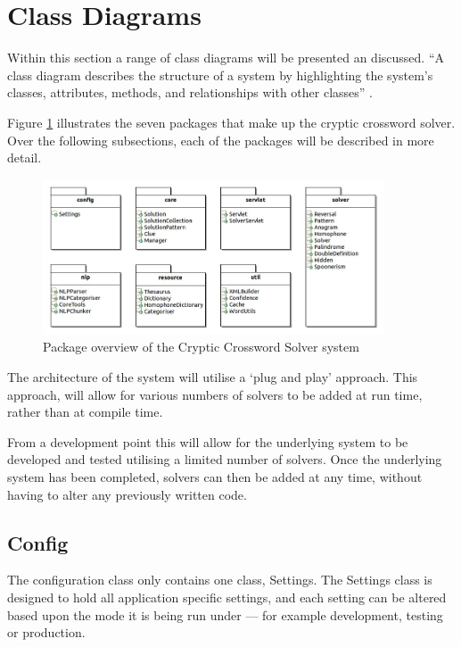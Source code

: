 \section{Class Diagrams}
\label{sec:class_diagram}

Within this section a range of class diagrams will be presented an discussed. 
``A class diagram describes the structure of a system by highlighting the 
system's classes, attributes, methods, and relationships with other classes''
\citep{lunn03}.

Figure \ref{fig:package_overview} illustrates the seven packages that make up 
the cryptic crossword solver. Over the following subsections, each of the 
packages will be described in more detail.

\begin{figure}[H]
  \centering
  \includegraphics[width=0.9\textwidth]{class/package_layout.jpg}
  \caption{Package overview of the Cryptic Crossword Solver system}
  \label{fig:package_overview}
\end{figure}

The architecture of the system will utilise a `plug and play' approach. This 
approach, will allow for various numbers of solvers to be added at run time, 
rather than at compile time.

From a development point this will allow for the underlying system to be 
developed and tested utilising a limited number of solvers. Once the underlying 
system has been completed, solvers can then be added at any time, without having 
to alter any previously written code.


\subsection{Config}
\label{sub:config}

The configuration class only contains one class, Settings. The Settings class is 
designed to hold all application specific settings, and each setting can be 
altered based upon the mode it is being run under --- for example development, 
testing or production.

